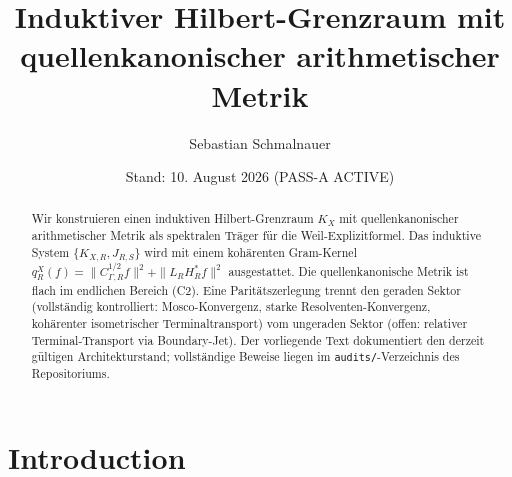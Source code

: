 \documentclass[12pt,a4paper]{amsart}
\newcommand{\KXR}{K_{X,R}}
\newcommand{\JRS}{J_{R,S}}
\newcommand{\CRG}{C_{\Gamma,R}}
\newcommand{\HR}{H_R}
\newcommand{\LR}{L_R}
\begin{document}

\title{Induktiver Hilbert-Grenzraum mit quellenkanonischer
  arithmetischer Metrik}

\author{Sebastian Schmalnauer}

\address{Objekt-X-Programm, P11}


\date{Stand: 10. August 2026 (PASS-A ACTIVE)}



\begin{abstract}
Wir konstruieren einen induktiven Hilbert-Grenzraum $K_X$ mit
quellenkanonischer arithmetischer Metrik als spektralen Träger
für die Weil-Explizitformel. Das induktive System
$\{\KXR, \JRS\}$ wird mit einem kohärenten Gram-Kernel
$q_R^X(f) = \|\CRG^{1/2} f\|^2 + \|\LR \HR^* f\|^2$
ausgestattet. Die quellenkanonische Metrik ist flach im endlichen
Bereich (C2). Eine Paritätszerlegung trennt den geraden Sektor
(vollständig kontrolliert: Mosco-Konvergenz, starke
Resolventen-Konvergenz, kohärenter isometrischer Terminaltransport)
vom ungeraden Sektor (offen: relativer Terminal-Transport via
Boundary-Jet). Der vorliegende Text dokumentiert den derzeit
gültigen Architekturstand; vollständige Beweise liegen im
\texttt{audits/}-Verzeichnis des Repositoriums.
\end{abstract}

\maketitle

\tableofcontents

\section{Introduction}
\label{sec:intro}

\end{document}
